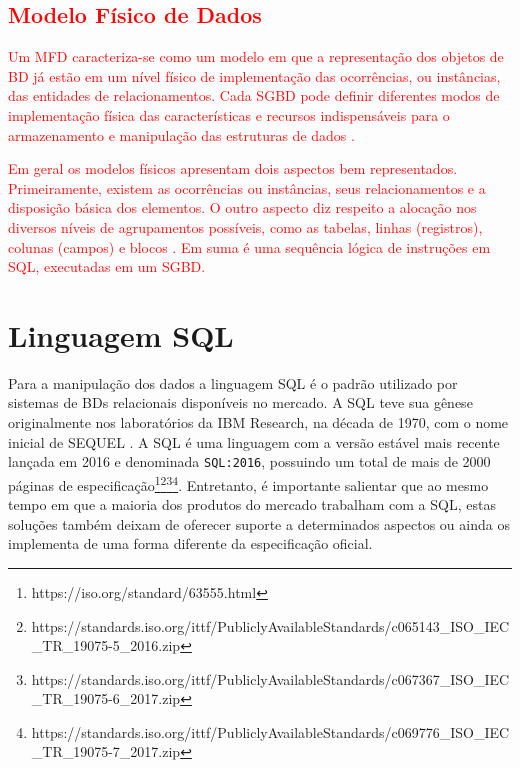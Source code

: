     \subsection{\textcolor{red}{Modelo Físico de Dados}} \label{ssec:ModelFisico}

\textcolor{red}{Um \ac{MFD} caracteriza-se como um modelo em que a representação dos objetos de \ac{BD} já estão em um nível físico de implementação das ocorrências, ou instâncias, das entidades de relacionamentos. 
Cada \ac{SGBD} pode definir diferentes modos de implementação física das características e recursos indispensáveis para o armazenamento e manipulação das estruturas de dados \cite{Cougo:2013}.}

\textcolor{red}{Em geral os modelos físicos apresentam dois aspectos bem representados. 
Primeiramente, existem as ocorrências ou instâncias, seus relacionamentos e a disposição básica dos elementos. 
O outro aspecto diz respeito a alocação nos diversos níveis de agrupamentos possíveis, como as tabelas, linhas (registros), colunas (campos) e blocos \cite{West:2011}.
Em suma é uma sequência lógica de instruções em \ac{SQL}, executadas em um \ac{SGBD}.}

\section{Linguagem SQL} \label{sec:LinguagemSQL}

Para a manipulação dos dados a linguagem \ac{SQL} é o  padrão utilizado por sistemas de \acp{BD} relacionais disponíveis no mercado. 
A \ac{SQL} teve sua gênese originalmente nos laboratórios da IBM Research, na década de 1970, com o nome inicial de SEQUEL \cite{Chamberlin:1974}.
A \ac{SQL} é uma linguagem com a versão estável mais recente lançada em 2016 e denominada \texttt{SQL:2016}, possuindo um total de mais de 2000 páginas de especificação\footnote{https://iso.org/standard/63555.html}\footnote{https://standards.iso.org/ittf/PubliclyAvailableStandards/c065143_ISO_IEC_TR_19075-5_2016.zip}\footnote{https://standards.iso.org/ittf/PubliclyAvailableStandards/c067367_ISO_IEC_TR_19075-6_2017.zip}\footnote{https://standards.iso.org/ittf/PubliclyAvailableStandards/c069776_ISO_IEC_TR_19075-7_2017.zip}. 
Entretanto, é importante salientar que ao mesmo tempo em que a maioria dos produtos do mercado trabalham com a \ac{SQL}, estas soluções também deixam de oferecer suporte a determinados aspectos ou ainda os implementa de uma forma diferente da especificação oficial. 

